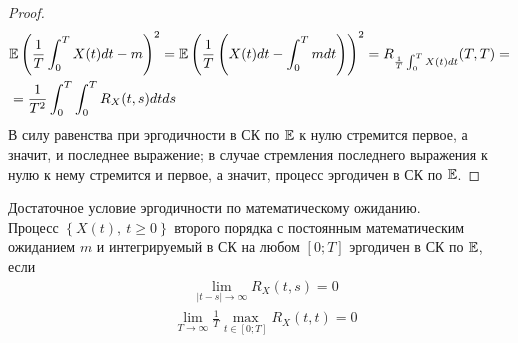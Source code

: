 \begin{proof}
    \begin{align*}
      & \mathbb{E} \left( \frac{1}{T} \int_{0}^T X(t) dt - m\right)^2 = \mathbb{E} \left( \frac{1}{T}\left( X(t)dt - \int_0^T m dt \right) \right)^2 = R_{\frac{1}{T}\int_0^T X(t) dt} (T,T) = \\
      & = \frac{1}{T^2}\int_0^T \int_0^T R_X(t,s) dt ds
    \end{align*}
    В силу равенства при эргодичности в СК по $\mathbb{E}$ к нулю стремится первое, а
    значит, и последнее выражение; в случае стремления последнего выражения к
    нулю к нему стремится и первое, а значит, процесс эргодичен в СК по $\mathbb{E}$.
\end{proof}
\begin{theorem}
    Достаточное условие эргодичности по математическому ожиданию.
    \\
    Процесс $\left\{ X(t), \ t \geq 0 \right\}$ второго порядка с постоянным
    математическим ожиданием $m$ и интегрируемый в СК на любом $[0;T]$ эргодичен
    в СК по $\mathbb{E}$, если
    \begin{align*}
      & \lim_{\left| t - s \right| \to \infty} R_X(t,s) = 0
    \end{align*}
    \begin{align*}
      & \lim_{T \to \infty} \frac{1}{T} \max_{t \in [0;T]}R_X(t,t) = 0
    \end{align*}
\end{theorem}

